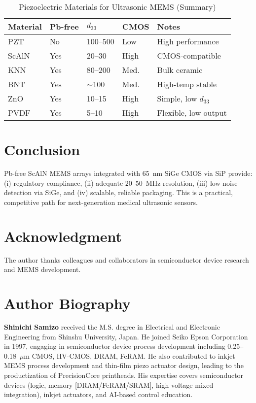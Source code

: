 \documentclass[conference]{IEEEtran}
\begin{document}
\begin{table}[!t]
\caption{Piezoelectric Materials for Ultrasonic MEMS (Summary)}
\label{tab:mat}
\centering
\begin{tabular}{@{}lllll@{}}
\toprule
Material & Pb-free & $d_{33}$ & CMOS & Notes\\
\midrule
PZT  & No  & 100--500 & Low  & High performance\\
ScAlN& Yes & 20--30   & High & CMOS-compatible\\
KNN  & Yes & 80--200  & Med. & Bulk ceramic\\
BNT  & Yes & $\sim$100& Med. & High-temp stable\\
ZnO  & Yes & 10--15   & High & Simple, low $d_{33}$\\
PVDF & Yes & 5--10    & High & Flexible, low output\\
\bottomrule
\end{tabular}
\end{table}

\section{Conclusion}
Pb-free ScAlN MEMS arrays integrated with 65~nm SiGe CMOS via SiP provide: (i) regulatory compliance, (ii) adequate 20--50~MHz resolution, (iii) low-noise detection via SiGe, and (iv) scalable, reliable packaging. This is a practical, competitive path for next-generation medical ultrasonic sensors.

\FloatBarrier

\section*{Acknowledgment}
The author thanks colleagues and collaborators in semiconductor device research and MEMS development.




\section*{Author Biography}
\textbf{Shinichi Samizo} received the M.S. degree in Electrical and Electronic Engineering from Shinshu University, Japan. He joined Seiko Epson Corporation in 1997, engaging in semiconductor device process development including 0.25--0.18~$\mu$m CMOS, HV-CMOS, DRAM, FeRAM. He also contributed to inkjet MEMS process development and thin-film piezo actuator design, leading to the productization of PrecisionCore printheads. His expertise covers semiconductor devices (logic, memory [DRAM/FeRAM/SRAM], high-voltage mixed integration), inkjet actuators, and AI-based control education.
\end{document}

